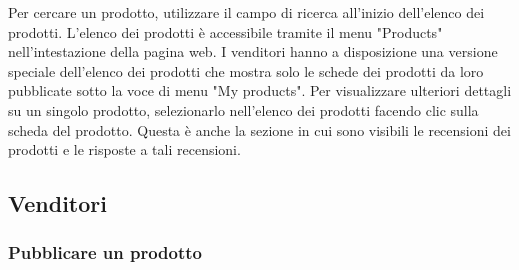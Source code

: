 \documentclass[conference,onecolumn,a4paper]{IEEEtran}
\begin{document}
{Per cercare un prodotto, utilizzare il campo di ricerca all'inizio dell'elenco dei prodotti. L'elenco dei prodotti è accessibile tramite il menu "Products" nell'intestazione della pagina web. I venditori hanno a disposizione una versione speciale dell'elenco dei prodotti che mostra solo le schede dei prodotti da loro pubblicate sotto la voce di menu "My products". Per visualizzare ulteriori dettagli su un singolo prodotto, selezionarlo nell'elenco dei prodotti facendo clic sulla scheda del prodotto. Questa è anche la sezione in cui sono visibili le recensioni dei prodotti e le risposte a tali recensioni.

\subsection{Venditori}

\subsubsection{Pubblicare un prodotto}

}
\end{document}
